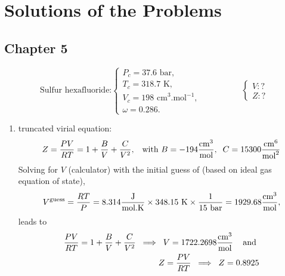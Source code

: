 \chapter{Solutions of the Problems}\label{Appendix_Solutions}


\localtableofcontents



\section{Chapter 5}\label{Appendix_Solutions:Chapter5}

%
  \begin{probsol}\label{Chapter:VolumetricPropertiesPureSubstances:Problem:01:solution} %
     \begin{displaymath}
        \text{Sulfur hexafluoride:} \begin{cases}
             P_{c} = \text{37.6 bar}, \\
             T_{c} = \text{318.7 K}, \\
             V_{c} = \text{198 cm}^{3}\text{.mol}^{-1},\\
             \omega = \text{0.286}.
             \end{cases} \hspace{2cm} \begin{cases} V:? \\ Z:? \end{cases}
     \end{displaymath}
   
     \begin{enumerate}[1.]
%
        \item truncated virial equation:
            \begin{displaymath}
               Z =  \displaystyle\frac{PV}{RT}=1+\displaystyle\frac{B}{V}+\displaystyle\frac{C}{V^{2}}, \;\;\;\text{with } B=-194\displaystyle\frac{\text{cm}^{3}}{\text{mol}},\;\;C=15300 \displaystyle\frac{\text{cm}^{6}}{\text{mol}^{2}}
            \end{displaymath}
            Solving for $V$ (calculator) with the initial guess of (based on ideal gas equation of state),
            \begin{displaymath}
               V^{\text{guess}} = \displaystyle\frac{RT}{P} = 8.314 \displaystyle\frac{\text{J}}{\text{mol.K}} \times 348.15\text{ K} \times \displaystyle\frac{1}{15\text{ bar}} = 1929.68 \displaystyle\frac{\text{cm}^{3}}{\text{mol}},
            \end{displaymath}
            leads to
            \begin{eqnarray}
               \displaystyle\frac{PV}{RT}=1+\displaystyle\frac{B}{V}+\displaystyle\frac{C}{V^{2}} \;\;\Longrightarrow \;\; V = 1722.2698 \displaystyle\frac{\text{cm}^{3}}{\text{mol}}\;\;\;\text{ and } \nonumber \\
               Z =  \displaystyle\frac{PV}{RT} \;\;\Longrightarrow \;\; Z = 0.8925
            \end{eqnarray}
%
     \end{enumerate}


  \end{probsol}
